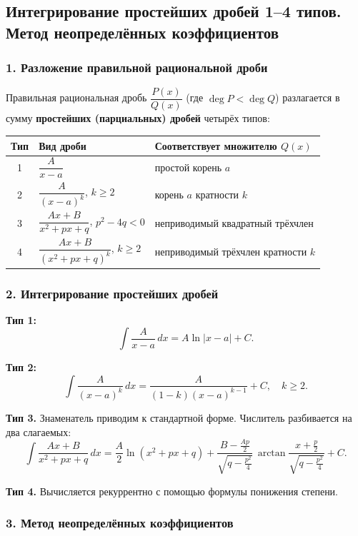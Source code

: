 \subsection{Интегрирование простейших дробей 1--4 типов. Метод неопределённых коэффициентов}

\subsubsection*{1. Разложение правильной рациональной дроби}

Правильная рациональная дробь $\dfrac{P(x)}{Q(x)}$ (где $\deg P < \deg Q$) разлагается в сумму \textbf{простейших (парциальных) дробей} четырёх типов:

\begin{center}
\renewcommand{\arraystretch}{2.0}
\begin{tabular}{|c|l|l|}
\hline
\textbf{Тип} & \textbf{Вид дроби} & \textbf{Соответствует множителю $Q(x)$} \\
\hline
1 & $\dfrac{A}{x - a}$ & простой корень $a$ \\
2 & $\dfrac{A}{(x-a)^k}$, $k \ge 2$ & корень $a$ кратности $k$ \\
3 & $\dfrac{Ax + B}{x^2+px+q}$, $p^2-4q<0$ & неприводимый квадратный трёхчлен \\
4 & $\dfrac{Ax+B}{(x^2+px+q)^k}$, $k\ge 2$ & неприводимый трёхчлен кратности $k$ \\
\hline
\end{tabular}
\end{center}

\subsubsection*{2. Интегрирование простейших дробей}

\textbf{Тип 1:}
\[
\int \frac{A}{x-a}\,dx = A\ln|x-a| + C.
\]

\textbf{Тип 2:}
\[
\int \frac{A}{(x-a)^k}\,dx = \frac{A}{(1-k)(x-a)^{k-1}} + C, \quad k \ge 2.
\]

\textbf{Тип 3.} Знаменатель приводим к стандартной форме. Числитель разбивается на два слагаемых:
\[
\int \frac{Ax+B}{x^2+px+q}\,dx
= \frac{A}{2}\ln(x^2+px+q)
+ \frac{B - \tfrac{Ap}{2}}{\sqrt{q - \tfrac{p^2}{4}}}\,
\arctan\frac{x + \tfrac{p}{2}}{\sqrt{q - \tfrac{p^2}{4}}} + C.
\]

\textbf{Тип 4.} Вычисляется рекуррентно с помощью формулы понижения степени.

\subsubsection*{3. Метод неопределённых коэффициентов}

